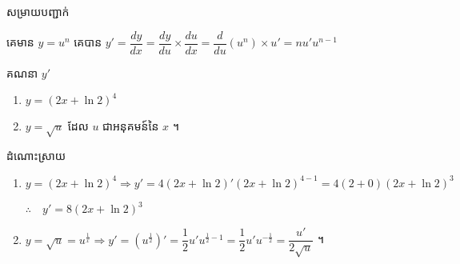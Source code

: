 \documentclass[12pt,fleqn]{book} %
\newcommand{\answer}{\begin{center}
\kml \color{magenta} ដំណោះស្រាយ
\end{center}}
\newcommand{\solution}{{\begin{center}\kml \color{magenta} សម្រាយបញ្ជាក់\end{center} }}
\begin{document}
\solution
គេមាន $y=u^n$ គេបាន $y'=\dfrac{dy}{dx}=\dfrac{dy}{du}\times \dfrac{du}{dx}=\dfrac{d}{du}(u^n)\times u'=nu'u^{n-1}$ 
\begin{example}
គណនា $y'$ 
\begin{multicols}{2}
\begin{enumerate}
\item $y=(2x+\ln 2)^4$
\item $y=\sqrt{u}$ ដែល $u$ ជាអនុគមន៍នៃ $x$ ។
\end{enumerate}
\end{multicols}
\end{example}
\answer
\begin{enumerate}

\item $y=(2x+\ln 2)^4\Longrightarrow y'=4(2x+\ln 2)'(2x+\ln 2)^{4-1}=4(2+0)(2x+\ln 2)^3$
\begin{center}
$\therefore \quad y'=8(2x+\ln 2)^3$
\end{center}
\item $y=\sqrt{u}=u^{\frac{1}{x}} \Longrightarrow y'=(u^{\frac{1}{2}})'=\dfrac{1}{2}u'u^{\frac{1}{2}-1}=\dfrac{1}{2}u'u^{-\frac{1}{2}}=\dfrac{u'}{2\sqrt{u}}$ ។ 
\end{enumerate}
\end{document}
